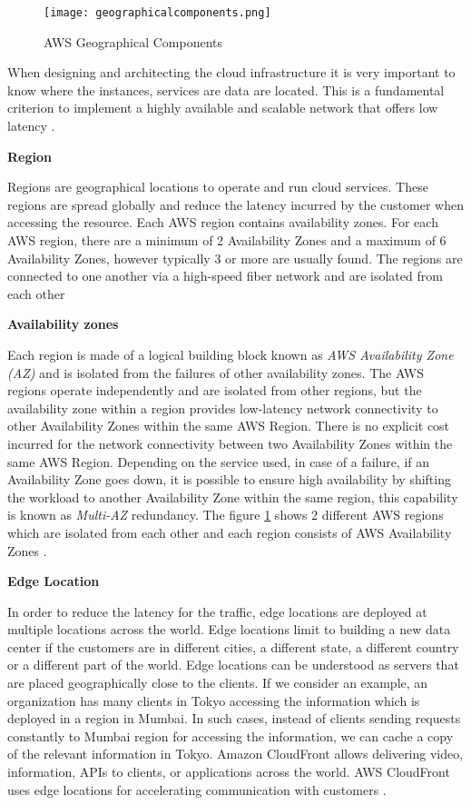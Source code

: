 \begin{figure}
    \centering
    \texttt{[image: geographicalcomponents.png]}
    \caption{AWS Geographical Components}{\cite{19}}
    \label{fig:identities}
\end{figure}

\par When designing and architecting the cloud infrastructure it is very important to know where the instances, services are data are located. This is a fundamental criterion to implement a highly available and scalable network that offers low latency \cite{19}.


\textbf{Region}
\par Regions are geographical locations to operate and run cloud services.
These regions are spread globally and reduce the latency incurred by the customer when accessing the resource.
Each AWS region contains availability zones.
For each AWS region, there are a minimum of 2 Availability
Zones and a
maximum of 6 Availability Zones, however typically 3 or more are usually found. The regions are connected to one another via a high-speed fiber network and are isolated from each other \cite{20}


\textbf{Availability zones}
\par Each region is made of a logical building block known as \textit{AWS Availability Zone (AZ)} and is isolated from the failures of other availability zones. The AWS regions operate independently and are isolated from other regions, but the availability zone within a region provides low-latency network connectivity to other Availability Zones within the same AWS Region. There is no explicit cost incurred for the network connectivity between two Availability Zones within the same AWS Region. Depending on the service used, in case of a failure, if an Availability Zone goes down, it is possible to ensure high availability by shifting the workload to another Availability Zone within the same region, this capability is known as \textit{Multi-AZ} redundancy. The figure \ref{fig:identities} shows 2 different AWS regions which are isolated from each other and each region consists of AWS Availability Zones \cite{21}.

\textbf{Edge Location}
\par In order to reduce the latency for the traffic, edge locations are deployed at multiple locations across the
world. Edge locations limit to building a new data center
if the customers are in different cities, a different
state, a different
country or a different
part of the world. Edge locations can be understood as servers that are placed geographically close to the clients.
If we consider an example, an organization has many clients in Tokyo accessing the information which is deployed in a
region in Mumbai. In such cases, instead of clients sending requests constantly to Mumbai region for accessing the
information, we can cache a copy of the relevant information in Tokyo. Amazon CloudFront allows delivering video,
information, APIs to clients, or applications across the world. AWS CloudFront uses edge locations for accelerating
communication with customers \cite{22}.

